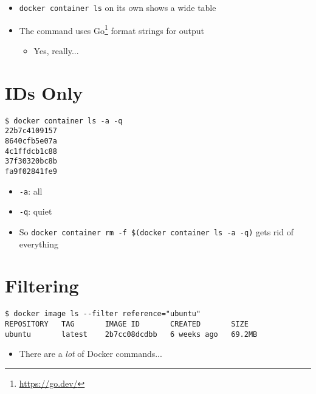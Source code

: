\documentclass[krantzl]{krantz}
\newcommand{\hreffoot}[2]{{#1}\footnote{\href{#2}{#2}}}
\begin{document}
\begin{itemize}
\item \texttt{docker container ls} on its own shows a wide table

\item The command uses \hreffoot{Go}{https://go.dev/} format strings for output\begin{itemize}
\item Yes, really...

\end{itemize}


\end{itemize}
\section{IDs Only}
\begin{lstlisting}[frame=tblr,backgroundcolor=\color{black!5}]
$ docker container ls -a -q
22b7c4109157
8640cfb5e07a
4c1ffdcb1c88
37f30320bc8b
fa9f02841fe9
\end{lstlisting}

\begin{itemize}
\item \texttt{-a}: all

\item \texttt{-q}: quiet

\item So \texttt{docker container rm  -f \$(docker container ls -a -q)} gets rid of everything

\end{itemize}
\section{Filtering}
\begin{lstlisting}[frame=tblr,backgroundcolor=\color{black!5}]
$ docker image ls --filter reference="ubuntu"
REPOSITORY   TAG       IMAGE ID       CREATED       SIZE
ubuntu       latest    2b7cc08dcdbb   6 weeks ago   69.2MB
\end{lstlisting}

\begin{itemize}
\item There are a \emph{lot} of Docker commands...

\end{itemize}
\end{document}

